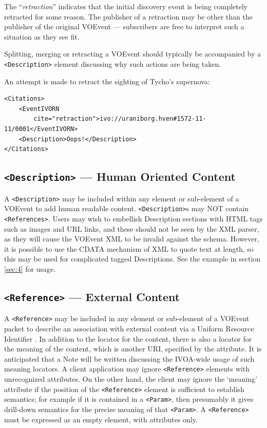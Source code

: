 \documentclass[11pt,a4paper]{ivoa}
\begin{document}
The ``\emph{retraction}''  indicates that the initial discovery event
is being completely retracted for some reason. The publisher of a retraction may
be other than the publisher of the original VOEvent --- subscribers are free to
interpret such a situation as they see fit.

Splitting, merging or retracting a VOEvent should typically be accompanied by a
\verb|<Description>| element discussing why such actions are being taken.

An attempt is made to retract the sighting of Tycho's supernova:
\begin{lstlisting}
<Citations>
    <EventIVORN
        cite="retraction">ivo://uraniborg.hven#1572-11-11/0001</EventIVORN>
    <Description>Oops!</Description>
</Citations>
\end{lstlisting}

\subsection{\texttt{<Description>} --- Human Oriented Content}
\label{sec:3.8}
A \verb|<Description>| may be included within any element or sub-element of a
VOEvent to add human readable content. \verb|<Description>|s may NOT
contain
\verb|<References>|. Users may wish to embellish Description sections with HTML tags
such as images and URL links, and these should not be seen by the XML parser, as
they will cause the VOEvent XML to be invalid against the schema. However, it is
possible to use the CDATA mechanism of XML to quote text at length, so this may
be used for complicated tagged Descriptions. See the example in section
\ref{sec:4} for usage.

\subsection{\texttt{<Reference>} --- External Content}
\label{sec:3.9}

A \verb|<Reference>| may be included in any element or sub-element of a VOEvent
packet to describe an association with external content via a Uniform Resource
Identifier \citep{std:RFC3986}. In addition to the locator for the
content, there is also a locator for the meaning of the content, which is
another URI, specified by the  attribute. It is anticipated that a
Note will be written discussing the IVOA-wide usage of such meaning locators. A
client application may ignore \verb|<Reference>| elements with
unrecognized  attributes. On the other hand, the client may ignore the `meaning'
attribute if the position of the \verb|<Reference>| element is sufficient to
establish semantics; for example if it is contained in a \verb|<Param>|, then
presumably it gives drill-down semantics for the precise meaning of that
\verb|<Param>|. A \verb|<Reference>| must be expressed as an empty element, with
attributes only.
\end{document}
